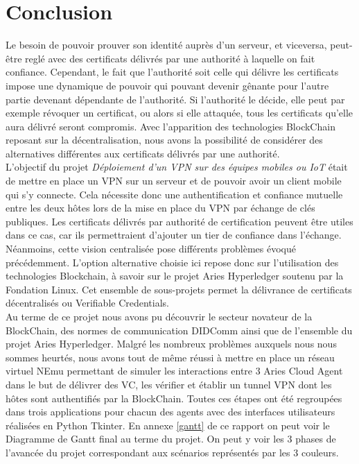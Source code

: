 \documentclass[12pt, openany]{report}
\begin{document}
\section{Conclusion}
\noindent 
\begin{flushleft}
Le besoin de pouvoir prouver son identité auprès d'un serveur, et viceversa, peut-être reglé avec des certificats délivrés par une authorité à laquelle on fait confiance. Cependant, le fait que l'authorité soit celle qui délivre les certificats impose une dynamique de pouvoir qui pouvant devenir gênante pour l'autre partie devenant dépendante de l'authorité. Si l'authorité le décide, elle peut par exemple révoquer un certificat, ou alors si elle attaquée, tous les certificats qu'elle aura délivré seront compromis. Avec l'apparition des technologies BlockChain reposant sur la décentralisation, nous avons la possibilité de considérer des alternatives différentes aux certificats délivrés par une authorité. \\
L'objectif du projet \textit{Déploiement d'un VPN sur des équipes mobiles ou IoT} était de mettre en place un VPN sur un serveur et de pouvoir avoir un client mobile qui s'y connecte. Cela nécessite donc une authentification et confiance mutuelle entre les deux hôtes lors de la mise en place du VPN par échange de clés publiques. Les certificats délivrés par authorité de certification peuvent être utiles dans ce cas, car ils permettraient d'ajouter un tier de confiance dans l'échange. Néanmoins, cette vision centralisée pose différents problèmes évoqué précédemment. L'option alternative choisie ici repose donc sur l'utilisation des technologies Blockchain, à savoir sur le projet Aries Hyperledger soutenu par la Fondation Linux. Cet ensemble de sous-projets permet la délivrance de certificats décentralisés ou Verifiable Credentials.\\
Au terme de ce projet nous avons pu découvrir le secteur novateur de la BlockChain, des normes de communication DIDComm ainsi que de l'ensemble du projet Aries Hyperledger. Malgré les nombreux problèmes auxquels nous nous sommes heurtés, nous avons tout de même réussi à mettre en place un réseau virtuel NEmu permettant de simuler les interactions entre 3 Aries Cloud Agent dans le but de délivrer des VC, les vérifier et établir un tunnel VPN dont les hôtes sont authentifiés par la BlockChain. Toutes ces étapes ont été regroupées dans trois applications pour chacun des agents avec des interfaces utilisateurs réalisées en Python Tkinter.
En annexe \ref{gantt} de ce rapport on peut voir le Diagramme de Gantt final au terme du projet. On peut y voir les 3 phases de l'avancée du projet correspondant aux scénarios représentés par les 3 couleurs.
\end{flushleft}
\end{document}
